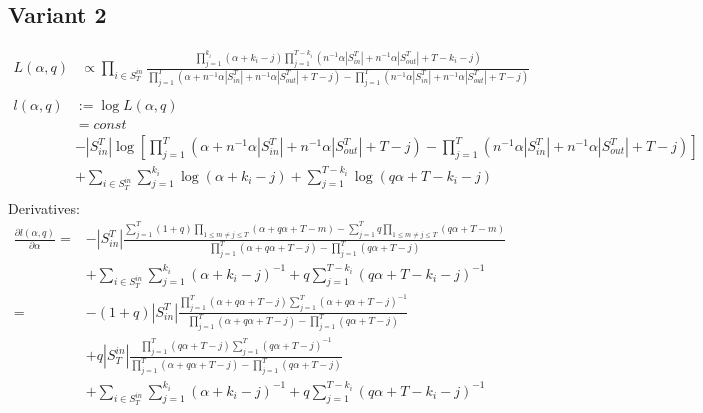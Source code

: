 \documentclass[a4paper, 12pt]{article}
\newcommand{\sout}{|S_{out}^T|}
\newcommand{\sint}{|S_{in}^T|}
\begin{document}
\subsection{Variant 2}
\begin{align*}
    L(\alpha, q) &\propto \prod_{i \in S_T^{in}} \frac{\prod_{j=1}^{k_i} (\alpha + k_i - j)\prod_{j=1}^{T - k_i} (n^{-1} \alpha \sint + n^{-1} \alpha \sout + T - k_i - j)}{\prod_{j=1}^T(\alpha + n^{-1}\alpha \sint + n^{-1} \alpha \sout + T - j) - \prod_{j=1}^T (n^{-1} \alpha \sint + n^{-1} \alpha \sout + T - j)} \\
\end{align*}
\begin{align} \label{eq:5}
    l(\alpha, q) &:= \log L(\alpha, q) \nonumber \\
    &= const \nonumber \\ 
    &-\sint \log\left[\prod_{j=1}^T(\alpha + n^{-1}\alpha \sint + n^{-1} \alpha \sout + T - j) - \prod_{j=1}^T (n^{-1} \alpha \sint + n^{-1} \alpha \sout + T - j)\right] \nonumber \\
    &+ \sum_{i \in S_T^{in}} \sum_{j = 1}^{k_i} \log(\alpha + k_i - j) + \sum_{j = 1}^{T - k_i} \log(q\alpha + T - k_i - j) \nonumber \\
\end{align}
Derivatives:
\begin{align} \label{eq:6}
    \frac{\partial l(\alpha, q)}{\partial \alpha} =& -\sint \frac{\sum_{j = 1}^{T} (1 + q) \prod_{1 \leq m \neq j \leq T} (\alpha + q\alpha + T - m) - \sum_{j = 1}^{T} q \prod_{1 \leq m \neq j \leq T} (q\alpha + T - m)}{\prod_{j = 1}^{T} (\alpha + q\alpha + T - j) - \prod_{j=1}^T (q\alpha + T - j)}\nonumber \\
    &+ \sum_{i \in S_T^{in}} \sum_{j = 1}^{k_i} (\alpha + k_i - j)^{-1} + q\sum_{j = 1}^{T - k_i} (q\alpha + T - k_i - j)^{-1} \nonumber \\
    =& -(1 + q)\sint \frac{ \prod_{j = 1}^{T} (\alpha + q\alpha + T - j) \sum_{j = 1}^{T} (\alpha + q\alpha + T - j)^{-1} }{\prod_{j = 1}^{T} (\alpha + q\alpha + T - j) - \prod_{j=1}^T (q\alpha + T - j)} \nonumber \\
    &+ q|S_T^{in}| \frac{\prod_{j = 1}^{T} (q\alpha + T - j) \sum_{j = 1}^{T} (q\alpha + T - j)^{-1}  }{ \prod_{j = 1}^{T} (\alpha + q\alpha + T - j) - \prod_{j=1}^T (q\alpha + T - j)} \nonumber \\
    &+ \sum_{i \in S_T^{in}} \sum_{j = 1}^{k_i} (\alpha + k_i - j)^{-1} + q\sum_{j = 1}^{T - k_i} (q\alpha + T - k_i - j)^{-1} \nonumber \\
\end{align}
\end{document}

